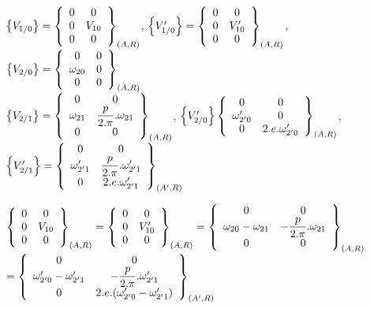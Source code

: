 $\left\{V_{1/0}\right\}=\left\{\begin{array}{c c} 0 & 0 \\ 0 & V_{10} \\ 0 & 0
\end{array}\right\}_{(A,R)}$,
$\left\{V'_{1/0}\right\}=\left\{\begin{array}{c c} 0 & 0 \\ 0 & V'_{10} \\ 0 & 0
\end{array}\right\}_{(A,R)}$,
$\left\{V_{2/0}\right\}=\left\{\begin{array}{c c} 0 & 0 \\ \omega_{20} & 0 \\ 0 & 0
\end{array}\right\}_{(A,R)}$ \\
$\left\{V_{2/1}\right\}=\left\{\begin{array}{c c} 0 & 0 \\ \omega_{21} & \dfrac{p}{2.\pi}.\omega_{21} \\ 0 & 0\end{array}\right\}_{(A,R)}$,
$\left\{V'_{2/0}\right\}\left\{\begin{array}{c c} 0 & 0 \\ \omega'_{2'0} & 0 \\ 0 & 2.e.\omega'_{2'0}\end{array}\right\}_{(A,R)}$,
$\left\{V'_{2/1}\right\}=\left\{\begin{array}{c c} 0 & 0 \\ \omega'_{2'1} & \dfrac{p}{2.\pi}.\omega'_{2'1} \\ 0 & 2.e.\omega'_{2'1} \end{array}\right\}_{(A',R)}$

$\left\{\begin{array}{c c} 0 & 0 \\ 0 & V_{10} \\ 0 & 0
\end{array}\right\}_{(A,R)}=\left\{\begin{array}{c c} 0 & 0 \\ 0 & V'_{10} \\ 0 & 0
\end{array}\right\}_{(A,R)}=\left\{\begin{array}{c c} 0 & 0 \\ \omega_{20}-\omega_{21} & -\dfrac{p}{2.\pi}.\omega_{21} \\ 0 & 0
\end{array}\right\}_{(A,R)}$\\$=\left\{\begin{array}{c c} 0 & 0 \\ \omega'_{2'0}-\omega'_{2'1} & -\dfrac{p}{2.\pi}.\omega'_{2'1} \\ 0 &  2.e.(\omega'_{2'0}-\omega'_{2'1})\end{array}\right\}_{(A',R)}$

